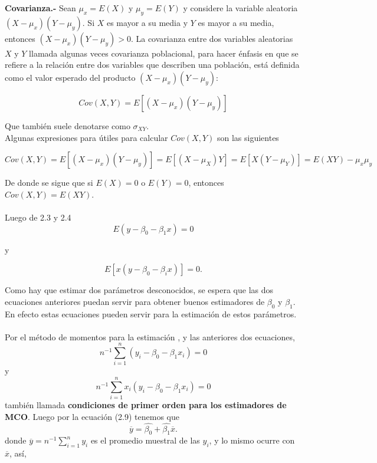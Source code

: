 \textbf{Covarianza.-} Sean $\mu_x = E(X)$ y $\mu_y = E(Y)$ y considere la variable aleatoria $(X-\mu_x)(Y-\mu_y)$. Si $X$ es mayor a su media y $Y$ es mayor a su media, entonces $(X-\mu_x)(Y-\mu_y)>0$. La covarianza entre dos variables aleatorias $X$ y $Y$ llamada algunas veces covarianza poblacional, para hacer énfasis en que se refiere a la relación entre dos variables que describen una población, está definida como el valor esperado del producto $(X-\mu_x)(Y-\mu_y)$: 

\begin{equation}
    Cov(X,Y) = E\left[(X-\mu_x)(Y-\mu_y)\right]
\end{equation}

Que también suele denotarse como $\sigma_{XY}.$  \\
Algunas expresiones para útiles para calcular $Cov(X,Y)$ son las siguientes

\begin{equation}
    Cov(X,Y) = E\left[(X-\mu_x)(Y-\mu_y)\right] = E\left[(X-\mu_X)Y\right] = E\left[X(Y-\mu_Y)\right] = E(XY) - \mu_x \mu_y
\end{equation}

De donde se sigue que si $E(X)=0$ o $E(Y)=0$, entonces $Cov(X,Y) = E(XY)$.\\\\

Luego de 2.3 y 2.4 
\begin{equation}
    E(y - \beta_0 - \beta_1x) = 0
\end{equation}
 
y 

\begin{equation}
    E\left[x(y - \beta_0 -\beta_i x )\right] = 0.
\end{equation}

Como hay que estimar dos parámetros desconocidos, se espera que las dos ecuaciones anteriores puedan servir para obtener buenos estimadores de $\beta_0$ y $\beta_1$. En efecto estas ecuaciones pueden servir para la estimación de estos parámetros.\\\\

Por el método de momentos para la estimación , y las anteriores dos ecuaciones,
\begin{equation}
    n^{-1} \sum\limits_{i=1}^n (y_i - \beta_0 - \beta_1x_i) = 0
\end{equation}
y 
\begin{equation}
    n^{-1} \sum\limits_{i=1}^n x_i(y_i - \beta_0 - \beta_1x_i) = 0
\end{equation}
también llamada \textbf{condiciones de primer orden para los estimadores de MCO}. Luego por la ecuación (2.9) tenemos que 
\begin{equation}
    \overline{y} = \hat{\beta_0} + \hat{\beta_1}\overline{x}.
\end{equation}
donde $\overline{y} = n^{-1}\sum\limits_{i=1}^n y_i$ es el promedio muestral de las $y_i$, y lo mismo ocurre con $\overline{x}$, así, 

